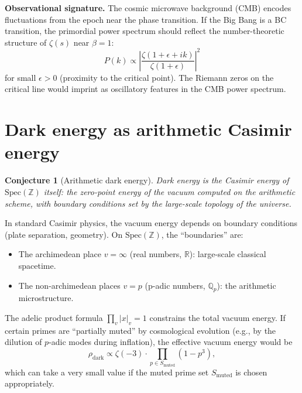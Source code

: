 \documentclass[11pt,a4paper]{article}
\newtheorem{conjecture}[theorem]{Conjecture}
\newcommand{\Spec}{\mathrm{Spec}}
\newcommand{\Qp}{\mathbb{Q}_p}
\begin{document}
\textbf{Observational signature.}
The cosmic microwave background (CMB) encodes fluctuations from
the epoch near the phase transition. If the Big Bang is a BC
transition, the primordial power spectrum should reflect the
number-theoretic structure of $\zeta(s)$ near $\beta = 1$:
\begin{equation}
  P(k) \propto \left|\frac{\zeta(1 + \epsilon + ik)}{\zeta(1+\epsilon)}\right|^2
\end{equation}
for small $\epsilon > 0$ (proximity to the critical point).
The Riemann zeros on the critical line would imprint as
oscillatory features in the CMB power spectrum.

\section{Dark energy as arithmetic Casimir energy}
\label{sec:dark}

\begin{conjecture}[Arithmetic dark energy]
\label{conj:dark}
Dark energy is the Casimir energy of $\Spec(\mathbb{Z})$ itself:
the zero-point energy of the vacuum computed on the arithmetic
scheme, with boundary conditions set by the large-scale topology
of the universe.
\end{conjecture}

In standard Casimir physics, the vacuum energy depends on
boundary conditions (plate separation, geometry).
On $\Spec(\mathbb{Z})$, the ``boundaries'' are:
\begin{itemize}
\item The archimedean place $v = \infty$ (real numbers, $\mathbb{R}$):
  large-scale classical spacetime.
\item The non-archimedean places $v = p$ (p-adic numbers, $\Qp$):
  the arithmetic microstructure.
\end{itemize}

The adelic product formula $\prod_v |x|_v = 1$ constrains the
total vacuum energy. If certain primes are ``partially muted''
by cosmological evolution (e.g., by the dilution of
$p$-adic modes during inflation), the effective vacuum energy
would be
\begin{equation}
  \rho_{\mathrm{dark}} \propto \zeta(-3) \cdot
  \prod_{p \in S_{\mathrm{muted}}} (1 - p^{3}),
\end{equation}
which can take a very small value if the muted prime set
$S_{\mathrm{muted}}$ is chosen appropriately.
\end{document}
